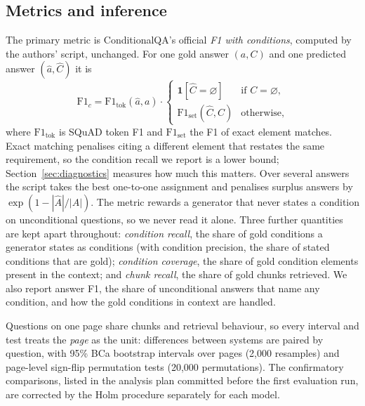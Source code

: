 \subsection{Metrics and inference}

The primary metric is ConditionalQA's official \emph{F1 with conditions}, computed by the authors' script, unchanged. For one gold answer $(a, C)$ and one predicted answer $(\hat a, \hat C)$ it is
\begin{equation}
\mathrm{F1}_c = \mathrm{F1}_{\mathrm{tok}}(\hat a, a)\cdot
\begin{cases}
\mathbf{1}[\hat C=\varnothing] & \text{if } C=\varnothing,\\
\mathrm{F1}_{\mathrm{set}}(\hat C, C) & \text{otherwise,}
\end{cases}
\end{equation}
where $\mathrm{F1}_{\mathrm{tok}}$ is SQuAD token F1 and $\mathrm{F1}_{\mathrm{set}}$ the F1 of exact element matches. Exact matching penalises citing a different element that restates the same requirement, so the condition recall we report is a lower bound; Section~\ref{sec:diagnostics} measures how much this matters. Over several answers the script takes the best one-to-one assignment and penalises surplus answers by $\exp(1-|\hat A|/|A|)$. The metric rewards a generator that never states a condition on unconditional questions, so we never read it alone. Three further quantities are kept apart throughout: \emph{condition recall}, the share of gold conditions a generator states as conditions (with condition precision, the share of stated conditions that are gold); \emph{condition coverage}, the share of gold condition elements present in the context; and \emph{chunk recall}, the share of gold chunks retrieved. We also report answer F1, the share of unconditional answers that name any condition, and how the gold conditions in context are handled.

Questions on one page share chunks and retrieval behaviour, so every interval and test treats the \emph{page} as the unit: differences between systems are paired by question, with 95\% BCa bootstrap intervals over pages (2{,}000 resamples) and page-level sign-flip permutation tests (20{,}000 permutations). The confirmatory comparisons, listed in the analysis plan committed before the first evaluation run, are corrected by the Holm procedure \cite{holm1979} separately for each model.

